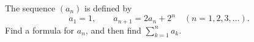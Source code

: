 The sequence $(a_n)$ is defined by
\[a_1=1,\qquad a_{n+1}=2a_n+2^n\quad(n=1,2,3,\dots).\]
Find a formula for $a_n$, and then find $\displaystyle\sum_{k=1}^{n}a_k$.
